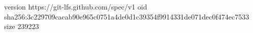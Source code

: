 version https://git-lfs.github.com/spec/v1
oid sha256:3c229709cacab90e965c0751a4de0d1c39354f9914331de071dec0f474ec7533
size 239223

